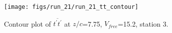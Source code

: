 \begin{figure}[H]
\centering
\texttt{[image: figs/run\_21/run\_21\_tt\_contour]}
\caption{Contour plot of $\overline{t^\prime t^\prime}$ at $z/c$=7.75, $V_{free}$=15.2, station 3.}
\label{fig:run_21_tt_contour}
\end{figure}


